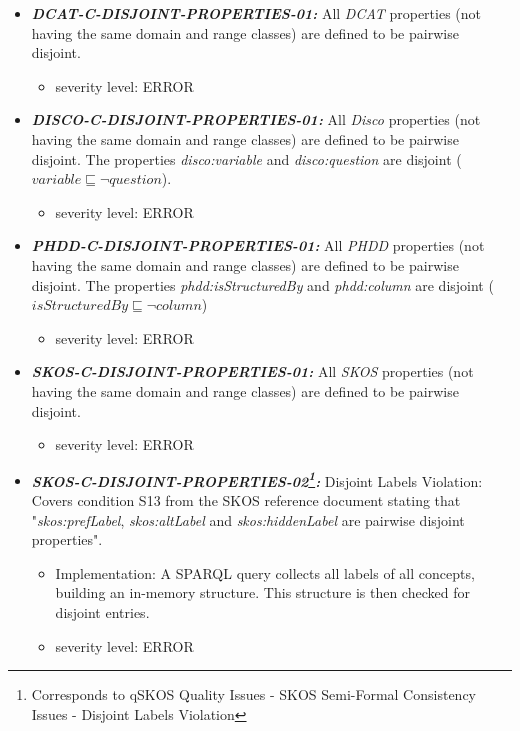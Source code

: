 \documentclass{llncs}
\begin{document}
\begin{itemize}
	\item \textbf{{\em DCAT-C-DISJOINT-PROPERTIES-01:}} 
	All \emph{DCAT} properties (not having the same domain and range classes) are defined to be pairwise disjoint.
	\begin{itemize}
		\item severity level: ERROR
	\end{itemize}
\end{itemize}

\begin{itemize}
	\item \textbf{{\em DISCO-C-DISJOINT-PROPERTIES-01:}} 
	All \emph{Disco} properties (not having the same domain and range classes) are defined to be pairwise disjoint.
  The properties \emph{disco:variable} and \emph{disco:question} are disjoint ($variable \sqsubseteq \neg question$).
	\begin{itemize}
		\item severity level: ERROR
	\end{itemize}
\end{itemize}

\begin{itemize}
	\item \textbf{{\em PHDD-C-DISJOINT-PROPERTIES-01:}} 
	All \emph{PHDD} properties (not having the same domain and range classes) are defined to be pairwise disjoint.
	The properties \emph{phdd:isStructuredBy} and \emph{phdd:column} are disjoint ($isStructuredBy \sqsubseteq \neg column$)
	\begin{itemize}
		\item severity level: ERROR
	\end{itemize}
\end{itemize}

\begin{itemize}

	\item \textbf{{\em SKOS-C-DISJOINT-PROPERTIES-01:}} 
	All \emph{SKOS} properties (not having the same domain and range classes) are defined to be pairwise disjoint.
	\begin{itemize}
		\item severity level: ERROR
	\end{itemize}
	\item \textbf{{\em SKOS-C-DISJOINT-PROPERTIES-02\footnote{Corresponds to qSKOS Quality Issues - SKOS Semi-Formal Consistency Issues - Disjoint Labels Violation}:}}
	Disjoint Labels Violation:
  Covers condition S13 from the SKOS reference document stating that "\emph{skos:prefLabel}, \emph{skos:altLabel} and \emph{skos:hiddenLabel} are pairwise disjoint properties". 
	\begin{itemize}
	  \item Implementation:
		A SPARQL query collects all labels of all concepts, building an in-memory structure. This structure is then checked for disjoint entries. 
		\item severity level: ERROR
	\end{itemize}
	
\end{itemize}
\end{document}
